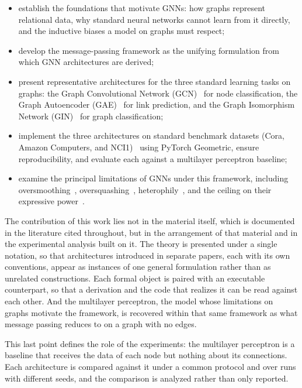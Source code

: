 \begin{itemize}
  \item establish the foundations that motivate GNNs: how graphs represent
        relational data, why standard neural networks cannot learn from it
        directly, and the inductive biases a model on graphs must respect;
  \item develop the message-passing framework as the unifying formulation from
        which GNN architectures are derived;
  \item present representative architectures for the three standard learning
        tasks on graphs: the Graph Convolutional Network (GCN)~\cite[-12pc]{kipf2017}
        for node classification, the Graph Autoencoder (GAE)~\cite[-7.5pc]{kipf2016} for
        link prediction, and the Graph Isomorphism Network (GIN)~\cite[-4.5pc]{xu2019}
        for graph classification;
  \item implement the three architectures on standard benchmark datasets
        (Cora, Amazon Computers, and NCI1)~\cite[-2.2pc]{sen2008,shchur2018,wale2008}
        using PyTorch Geometric, ensure reproducibility, and evaluate each
        against a multilayer perceptron baseline;
  \item examine the principal limitations of GNNs under this framework,
        including oversmoothing~\cite[0.6pc]{li2018},
        oversquashing~\cite[0.5pc]{alon2021}, heterophily~\cite[0.5pc]{zhu2020}, and the
        ceiling on their expressive power~\cite[0.5pc]{xu2019}.
\end{itemize}

The contribution of this work lies not in the material itself, which is
documented in the literature cited throughout, but in the arrangement of that
material and in the experimental analysis built on it. The theory is presented
under a single notation, so that architectures introduced in separate papers,
each with its own conventions, appear as instances of one general formulation
rather than as unrelated constructions. Each formal object is paired with an
executable counterpart, so that a derivation and the code that realizes it can
be read against each other. And the multilayer perceptron, the model whose
limitations on graphs motivate the framework, is recovered within that same
framework as what message passing reduces to on a graph with no edges.

This last point defines the role of the experiments: the multilayer perceptron
is a baseline that receives the data of each node but nothing about its
connections. Each architecture is compared against it under a common protocol
and over runs with different seeds, and the comparison is analyzed rather than
only reported.

